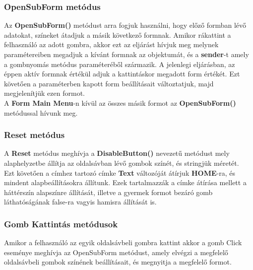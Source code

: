 \documentclass[tocnopagenum]{thesis-ekf}
\theoremstyle{definition}
\theoremstyle{remark}
\begin{document}
	\subsubsection{OpenSubForm metódus}
	Az \textbf{OpenSubForm()} metódust arra fogjuk használni, hogy előző formban lévő adatokat, színeket átadjuk a másik következő formnak. Amikor rákattint a felhasználó az adott gombra, akkor ezt az eljárást hívjuk meg melynek paramétereiben megadjuk a kívánt formnak az objektumát, és a \textbf{sender}-t amely a gombnyomás metódus paraméteréből származik. A jelenlegi eljárásban, az éppen aktív formnak értékül adjuk a kattintáskor megadott form értékét. Ezt követően a paraméterben kapott form beállításait változtatjuk, majd megjelenítjük ezen formot. 
	\\
	A \textbf{Form Main Menu}-n kívül az összes másik formot az \textbf{OpenSubForm()} metódussal hívunk meg.
	\subsubsection{Reset metódus}
	A \textbf{Reset} metódus meghívja a \textbf{DisableButton()} nevezetű metódust mely alaphelyzetbe állítja az oldalsávban lévő gombok színét, és stringjük méretét.
	\\
	Ezt követően a címhez tartozó címke \textbf{Text} változóját átírjuk \textbf{HOME}-ra, és mindent alapbeállításokra állítunk. Ezek tartalmazzák a címke átírása mellett a háttérszín alapszínre állítását, illetve a gyermek formot bezáró gomb láthatóságának false-ra vagyis hamisra állítását is.
	\\
	\subsubsection{Gomb Kattintás metódusok}
	Amikor a felhasználó az egyik oldalsávbeli gombra kattint akkor a gomb Click eseménye meghívja az OpenSubForm metódust, amely elvégzi a megfelelő oldalsávbeli gombok színének beállításait, és megnyitja a megfelelő formot.
\end{document}

